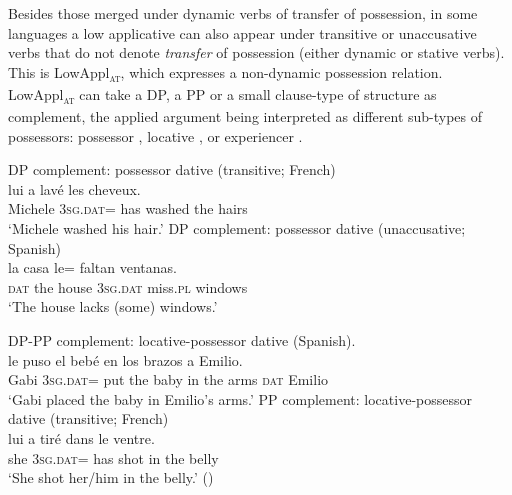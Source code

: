 \documentclass[output=paper,colorlinks,citecolor=brown,nonflat]{./langscibook}
\begin{document}
Besides those merged under dynamic verbs of transfer of possession, in some languages a low applicative can also appear under transitive or unaccusative verbs that do not denote \textit{transfer} of possession (either dynamic or stative verbs). This is  LowAppl\textsc{\textsubscript{at}}, which expresses a non-dynamic possession relation. LowAppl\textsc{\textsubscript{at}} can take  a DP, a PP or a small clause-type of structure as complement, the applied argument being interpreted as different sub-types of possessors: possessor , locative , or experiencer .

\ea%
    \label{ex:cuervo:6}
    \ea%
        \label{ex:cuervo:6a}
        DP complement: possessor dative (transitive; French)\\
         {lui} {a} {lavé} {les} {cheveux}.\\
        Michele 3\textsc{sg.dat}= has washed the hairs\\
        \glt ‘Michele washed his hair.’
    \ex%
        \label{ex:cuervo:6b}
        DP complement: possessor dative (unaccusative; Spanish)\\
         {la} {casa} {le}= {faltan} {ventanas}.\\
        \textsc{dat} the house 3\textsc{sg.dat} miss.\textsc{pl} windows\\
        \glt ‘The house lacks (some) windows.’
    \z
\z

\ea%
    \label{ex:cuervo:7}
    \ea%
        \label{ex:cuervo:7a}
        DP-PP complement: locative-possessor dative (Spanish).\\
         {le} {puso} {el} {bebé}  {en} {los} {brazos} {a} {Emilio}.\\
        Gabi 3\textsc{sg.dat}= put the baby in the arms \textsc{dat} Emilio \\
        \glt ‘Gabi placed the baby in Emilio’s arms.’
    \ex%
        \label{ex:cuervo:7b}
        PP complement: locative-possessor dative (transitive; French)\\
         {lui} {a} {tiré} {dans} {le} {ventre}.\\
        she 3\textsc{sg.dat}= has shot in the belly\\
        \glt ‘She shot her/him in the belly.’  (\citealt{BonehNash2012})
    \z
\z
\end{document}

